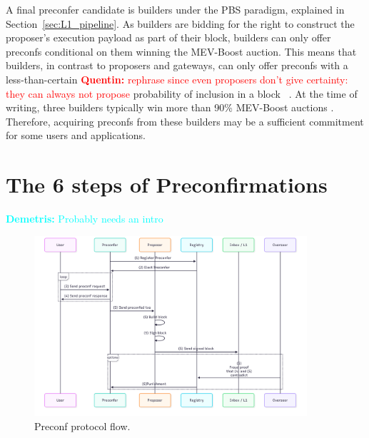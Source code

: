 \documentclass[a4paper]{article}
\theoremstyle{boldstyle}
\newcommand{\qb}[1]{\textcolor{red}{\textbf{Quentin:} #1}}
\newcommand{\dk}[1]{\textcolor{cyan}{\textbf{Demetris:} #1}}
\begin{document}
        A final preconfer candidate is builders under the PBS paradigm, explained in Section~\ref{sec:L1_pipeline}. As builders are bidding for the right to construct the proposer's execution payload as part of their block, builders can only offer preconfs conditional on them winning the MEV-Boost auction. This means that builders, in contrast to proposers and gateways, can only offer preconfs with a less-than-certain \qb{rephrase since even proposers don't give certainty: they can always not propose} probability of inclusion in a block ~\cite{W:PreconfirmationFairExchange,W:LeaderlessandLeader-BasedPreconfirmations}. At the time of writing, three builders typically win more than 90\% MEV-Boost auctions \cite{MEV.pics}. Therefore, acquiring preconfs from these builders may be a sufficient commitment for some users and applications. 




\section{The 6 steps of Preconfirmations}
\dk{Probably needs an intro}

    \begin{figure}[htbp]
        \centering
        \includegraphics[width=0.9\textwidth]{figures/preconfProtocolFlow.png}
        \caption{Preconf protocol flow.}
        \label{preconf_protocol_flow}
    \end{figure}
    
\end{document}

